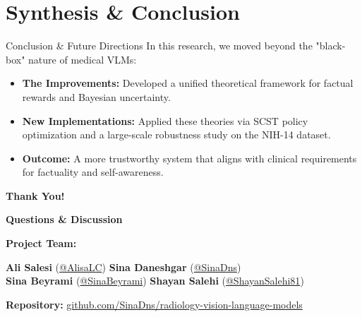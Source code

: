 \documentclass[aspectratio=169]{beamer}
\begin{document}
\section{Synthesis \& Conclusion}

\begin{frame}{Conclusion \& Future Directions}
  In this research, we moved beyond the "black-box" nature of medical VLMs:
  \vspace{0.3cm}
  \begin{itemize}
    \item \textbf{The Improvements:} Developed a unified theoretical framework for factual rewards and Bayesian uncertainty.
    \item \textbf{New Implementations:} Applied these theories via SCST policy optimization and a large-scale robustness study on the NIH-14 dataset.
    \item \textbf{Outcome:} A more trustworthy system that aligns with clinical requirements for factuality and self-awareness.
  \end{itemize}
\end{frame}

\begin{frame}
  \centering
  \vspace{1cm}
  {\Huge \textbf{Thank You!}}
  
  \vspace{0.5cm}
  {\Large \textbf{Questions \& Discussion}}
  
  \vspace{1cm}
  
  \textbf{Project Team:}
  
  \vspace{0.3cm}
  \begin{minipage}{0.8\textwidth}
    \centering
    \textbf{Ali Salesi} (\href{https://github.com/AlisaLC}{@AlisaLC}) \quad \textbf{Sina Daneshgar} (\href{https://github.com/SinaDns}{@SinaDns}) \\
    \vspace{0.2cm}
    \textbf{Sina Beyrami} (\href{https://github.com/SinaBeyrami}{@SinaBeyrami}) \quad \textbf{Shayan Salehi} (\href{https://github.com/ShayanSalehi81}{@ShayanSalehi81})
  \end{minipage}

  \vspace{0.5cm}
  \small \textbf{Repository:} \href{https://github.com/SinaDns/radiology-vision-language-models}{github.com/SinaDns/radiology-vision-language-models}
\end{frame}
\end{document}
